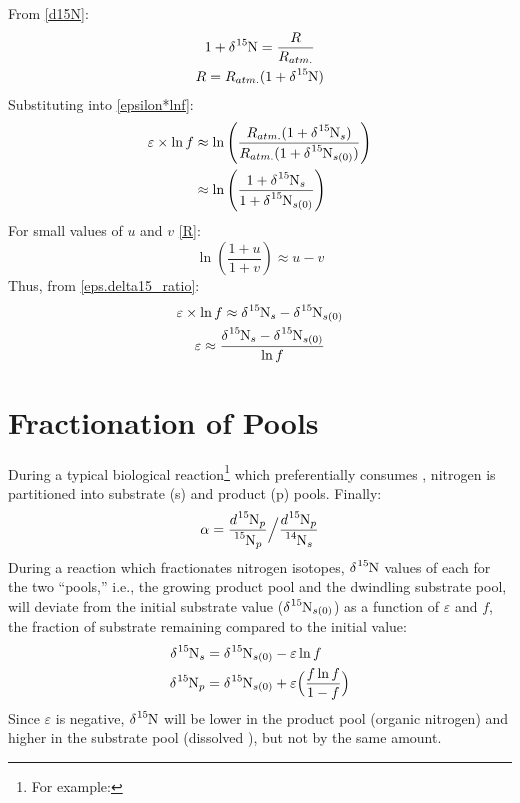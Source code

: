 \documentclass[12pt, twocolumn]{article}
\begin{document}
From \eqref{d15N}:
\begin{gather}
1+\delta\ce{^{15}N}=\frac{R}{R_{atm.}}\nonumber\\
R=R_{atm.}(1+\delta\ce{^{15}N})
\end{gather}
Substituting into \eqref{epsilon*lnf}:
\begin{align}
    \varepsilon \times \ln{f} &\approx \ln{\left(\frac{R_{atm.}(1+\delta\ce{^{15}N}_s)}{R_{atm.}(1+\delta\ce{^{15}N}_{s(0)})}\right)}\nonumber\\
    &\approx \ln{\left(\frac{1+\delta\ce{^{15}N}_s}{1+\delta\ce{^{15}N}_{s(0)}}\right)}\label{eps.delta15_ratio}
\end{align}
For small values of $u$ and $v$ \eqref{R}:
\[\ln{\left(\frac{1+u}{1+v}\right)}\approx u-v\]
Thus, from \eqref{eps.delta15_ratio}:
\begin{gather}
    \varepsilon \times \ln{f} \approx \delta\ce{^{15}N}_s - \delta\ce{^{15}N}_{s(0)}\nonumber\\
    \varepsilon \approx \frac{\delta\ce{^{15}N}_s - \delta\ce{^{15}N}_{s(0)}}{\ln{f}}
\end{gather}
\section{Fractionation of Pools}
During a typical biological reaction\footnote{For example: } which preferentially consumes , nitrogen is partitioned into substrate (s) and product (p) pools. 
Finally:
\begin{equation}
    \alpha = \dfrac{d\ce{^{15}N_p}}{\ce{^{15}N_p}}\Big/\dfrac{d\ce{^{15}N_p}}{\ce{^{14}N_s}}
\end{equation}
During a reaction which fractionates nitrogen isotopes,  $\delta\ce{^{15}N}$ values of each for the two ``pools,'' i.e., the growing product pool and the dwindling substrate pool, will deviate from the initial substrate value ($\delta\ce{^{15}N_{s(0)}}$) as a function of $\varepsilon$ and $f$, the fraction of substrate remaining compared to the initial value:
\begin{align}
    \delta\ce{^{15}N_s}&=\delta\ce{^{15}N_{s(0)}}-\varepsilon\ln{f}\label{d15ns}\\
    \delta\ce{^{15}N_p}&=\delta\ce{^{15}N_{s(0)}}+\varepsilon\Big(\frac{f\ln{f}}{1-f}\Big)\label{d15np}
\end{align}
Since $\varepsilon$ is negative, $\delta\ce{^{15}N}$ will be lower in the product pool (organic nitrogen) and higher in the substrate pool (dissolved ), but not by the same amount.
\end{document}
